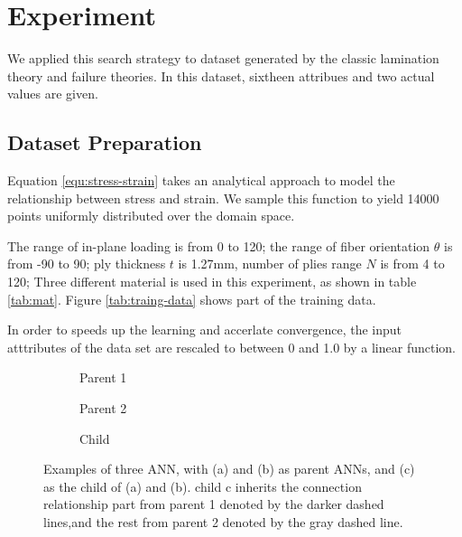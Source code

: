 \section{Experiment}
We applied this search strategy to dataset generated by the classic lamination
theory and failure theories. In this dataset, sixtheen attribues and two actual
values are given.
\subsection{Dataset Preparation}
Equation \ref{equ:stress-strain} takes an analytical approach to model the
relationship between stress and strain. We sample this function to yield 14000 points
uniformly distributed over the domain space.

The range of in-plane loading is from 0 to 120; the range of fiber orientation $\theta$ is from
-90 to 90; ply thickness $t$ is 1.27mm, number of plies range $N$ is from 4 to 120;
Three different material is used in this experiment, as shown in table \ref{tab:mat}.
Figure \ref{tab:traing-data} shows part of the training data.

In order to speeds up the learning and accerlate convergence, the input
atttributes of the data set are rescaled to between 0 and 1.0 by a linear function.




\begin{figure}[h!]
	\centering
	\begin{subfigure}[b]{1.0\linewidth}
		\centering
		
		\caption{Parent 1}
		\label{fig:p1}
	\end{subfigure}
	\newline
	\begin{subfigure}[b]{1.0\linewidth}
		\centering
		
		\caption{Parent 2}
		\label{fig:p2}
	\end{subfigure}
	\newline
	\begin{subfigure}[b]{1.0\linewidth}
		\centering
		
		\caption{Child}
		\label{fig:child}
	\end{subfigure}
	\caption{Examples of three ANN, with (a) and (b) as parent ANNs, and (c) as
		the child of (a) and (b). child c inherits the connection relationship
		part from parent 1 denoted by the darker dashed lines,and the rest from
		parent 2 denoted by the gray dashed line.}
	\label{fig:search}
\end{figure}
